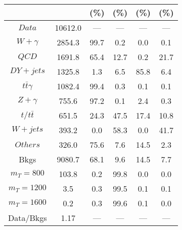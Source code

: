 \begin{figure}
\begin{minipage}[c]{0.32\textwidth}
{\begin{tabular}{cccccc}
 &  & (\%) & (\%) & (\%) & (\%)  \\
\hline
                                                                      $ Data $ &  10612.0 &  --- &  --- &  --- &  ---\\
$ W+\gamma $ &  2854.3 &  99.7 &  0.2 &  0.0 &  0.1\\
$ QCD $ &  1691.8 &  65.4 &  12.7 &  0.2 &  21.7\\
$ DY+jets $ &  1325.8 &  1.3 &  6.5 &  85.8 &  6.4\\
$ t\bar{t}\gamma $ &  1082.4 &  99.4 &  0.3 &  0.1 &  0.1\\
$ Z+\gamma $ &  755.6 &  97.2 &  0.1 &  2.4 &  0.3\\
$ t/t\bar{t} $ &  651.5 &  24.3 &  47.5 &  17.4 &  10.8\\
$ W+jets $ &  393.2 &  0.0 &  58.3 &  0.0 &  41.7\\
$ Others $ &  326.0 &  75.6 &  7.6 &  14.5 &  2.3\\
Bkgs &  9080.7 &  68.1 &  9.6 &  14.5 &  7.7\\
$ m_{T} = 800 $ &  103.8 &  0.2 &  99.8 &  0.0 &  0.0\\
$ m_{T} = 1200 $ &  3.5 &  0.3 &  99.5 &  0.1 &  0.1\\
$ m_{T} = 1600 $ &  0.2 &  0.3 &  99.6 &  0.1 &  0.0\\
Data/Bkgs &  1.17 &  --- &  --- &  --- &  ---\\
\hline
\end{tabular}
}
\end{minipage}
\end{figure}

